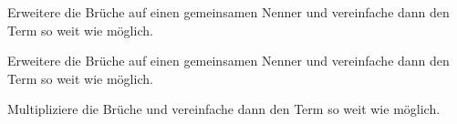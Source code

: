 \documentclass[11pt]{exam}
\begin{document}
\begin{questions}


\question[6]
Erweitere die Brüche auf einen gemeinsamen Nenner und vereinfache dann den Term so weit wie möglich.


\question[6]
Erweitere die Brüche auf einen gemeinsamen Nenner und vereinfache dann den Term so weit wie möglich.

\question[6]
Multipliziere die Brüche und vereinfache dann den Term so weit wie möglich.


\end{questions}
\end{document}
